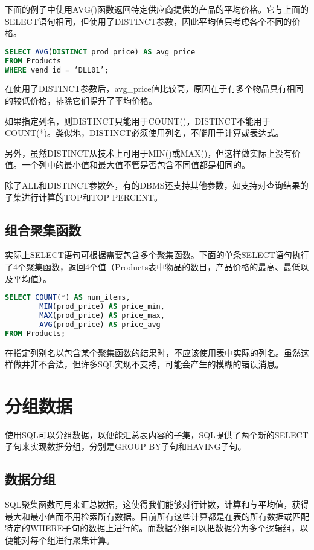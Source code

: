 下面的例子中使用AVG()函数返回特定供应商提供的产品的平均价格。它与上面的SELECT语句相同，但使用了DISTINCT参数，因此平均值只考虑各个不同的价格。

\begin{lstlisting}[language=SQL]
SELECT AVG(DISTINCT prod_price) AS avg_price
FROM Products
WHERE vend_id = ‘DLL01’;
\end{lstlisting}

在使用了DISTINCT参数后，avg\_price值比较高，原因在于有多个物品具有相同的较低价格，排除它们提升了平均价格。

如果指定列名，则DISTINCT只能用于COUNT()，DISTINCT不能用于COUNT(*)。类似地，DISTINCT必须使用列名，不能用于计算或表达式。

另外，虽然DISTINCT从技术上可用于MIN()或MAX()，但这样做实际上没有价值。一个列中的最小值和最大值不管是否包含不同值都是相同的。

除了ALL和DISTINCT参数外，有的DBMS还支持其他参数，如支持对查询结果的子集进行计算的TOP和TOP PERCENT。
\subsection{组合聚集函数}

实际上SELECT语句可根据需要包含多个聚集函数。下面的单条SELECT语句执行了4个聚集函数，返回4个值（Products表中物品的数目，产品价格的最高、最低以及平均值）。

\begin{lstlisting}[language=SQL]
SELECT COUNT(*) AS num_items,
		MIN(prod_price) AS price_min,
		MAX(prod_price) AS price_max,
		AVG(prod_price) AS price_avg
FROM Products;
\end{lstlisting}

在指定列别名以包含某个聚集函数的结果时，不应该使用表中实际的列名。虽然这样做并非不合法，但许多SQL实现不支持，可能会产生的模糊的错误消息。
\section{分组数据}

使用SQL可以分组数据，以便能汇总表内容的子集，SQL提供了两个新的SELECT子句来实现数据分组，分别是GROUP BY子句和HAVING子句。
\subsection{数据分组}

SQL聚集函数可用来汇总数据，这使得我们能够对行计数，计算和与平均值，获得最大和最小值而不用检索所有数据。目前所有这些计算都是在表的所有数据或匹配特定的WHERE子句的数据上进行的。而数据分组可以把数据分为多个逻辑组，以便能对每个组进行聚集计算。
